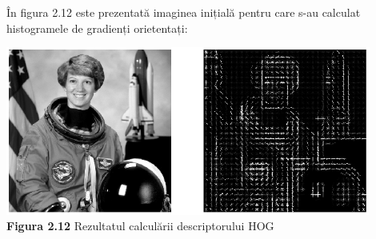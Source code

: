 \documentclass[a4paper,12pt]{report}
\newcommand\tab[1][1cm]{\hspace*{#1}}
\begin{document}
\tab În figura 2.12 este prezentată imaginea inițială pentru care s-au calculat histogramele de gradienți orietentați:
\begin {center} 
	\begin {footnotesize} 
		\includegraphics[width = 120mm]{fig2_12} \\
		\textbf  {Figura 2.12} Rezultatul calculării descriptorului HOG\cite{opencv5}
	\end {footnotesize} 
\end {center}
\end{document}
